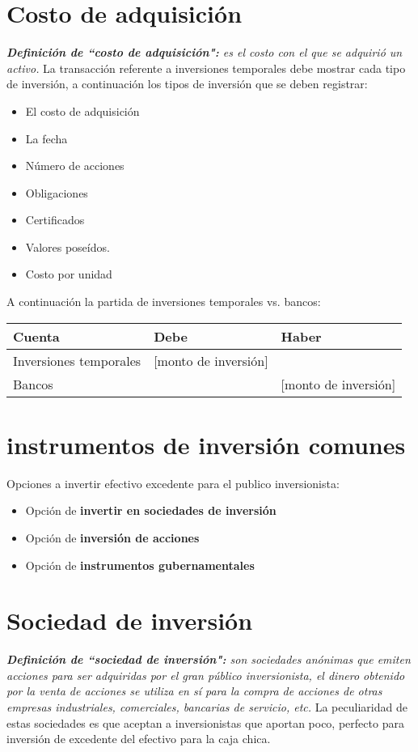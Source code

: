 \documentclass{article}
\begin{document}
\section{Costo de adquisición}
\emph{\textbf{Definición de ``costo de adquisición":} es el costo con el que se adquirió un activo. }\newline 
La transacción referente a inversiones temporales debe mostrar cada tipo de inversión, a continuación los tipos de inversión que se deben registrar:
\begin{itemize}
    \item El costo de adquisición
    \item La fecha 
    \item Número de acciones 
    \item Obligaciones 
    \item Certificados 
    \item Valores poseídos.
    \item Costo por unidad
\end{itemize}
A continuación la partida de inversiones temporales vs. bancos:
\begin{center}
\begin{tabular}{ | p{9cm} | p{3cm} | p{3cm} | }
 \hline
Cuenta & Debe & Haber \\
\hline
Inversiones temporales & [monto de inversión] & \\ 
Bancos & & [monto de inversión] \\ 
 \hline
\end{tabular}
\end{center}

\section{instrumentos de inversión comunes}
Opciones a invertir efectivo excedente para el publico inversionista:
\begin{itemize}
    \item Opción de \textbf{invertir en sociedades de inversión} 
    \item Opción de \textbf{inversión de acciones }
    \item Opción de \textbf{instrumentos gubernamentales}
\end{itemize}

\section{Sociedad de inversión}
\emph{\textbf{Definición de ``sociedad de inversión":} son sociedades anónimas que emiten acciones para ser adquiridas por el gran público inversionista, el dinero obtenido por la venta de acciones se utiliza en sí para la compra de acciones de otras empresas industriales, comerciales, bancarias de servicio, etc.}
La peculiaridad de estas sociedades es que aceptan a inversionistas que aportan poco, perfecto para inversión de excedente del efectivo para la caja chica.
\end{document}
